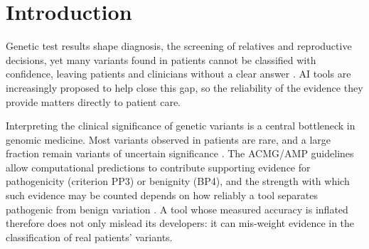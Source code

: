 \documentclass[11pt]{article}
\begin{document}
\begin{center}
\end{center}

\section{Introduction}
Genetic test results shape diagnosis, the screening of relatives and reproductive decisions, yet many variants found in patients cannot be classified with confidence, leaving patients and clinicians without a clear answer \citep{richards2015acmg,landrum2018clinvar}. AI tools are increasingly proposed to help close this gap, so the reliability of the evidence they provide matters directly to patient care.

Interpreting the clinical significance of genetic variants is a central bottleneck in genomic medicine. Most variants observed in patients are rare, and a large fraction remain variants of uncertain significance \citep{richards2015acmg,landrum2018clinvar}. The ACMG/AMP guidelines allow computational predictions to contribute supporting evidence for pathogenicity (criterion PP3) or benignity (BP4), and the strength with which such evidence may be counted depends on how reliably a tool separates pathogenic from benign variation \citep{richards2015acmg,tavtigian2018bayesian,pejaver2022calibration}. A tool whose measured accuracy is inflated therefore does not only mislead its developers: it can mis-weight evidence in the classification of real patients' variants.
\end{document}

